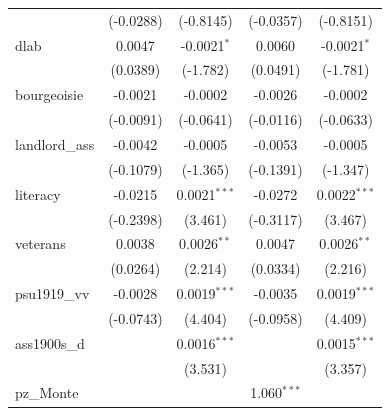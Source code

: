 \begin{table}[htbp]
\begin{tabular}{lcccc}
                                       & (-0.0288)             & (-0.8145)              & (-0.0357)            & (-0.8151)\\   
      dlab                             & 0.0047                & -0.0021$^{*}$          & 0.0060               & -0.0021$^{*}$\\   
                                       & (0.0389)              & (-1.782)               & (0.0491)             & (-1.781)\\   
      bourgeoisie                      & -0.0021               & -0.0002                & -0.0026              & -0.0002\\   
                                       & (-0.0091)             & (-0.0641)              & (-0.0116)            & (-0.0633)\\   
      landlord\_ass                    & -0.0042               & -0.0005                & -0.0053              & -0.0005\\   
                                       & (-0.1079)             & (-1.365)               & (-0.1391)            & (-1.347)\\   
      literacy                         & -0.0215               & 0.0021$^{***}$         & -0.0272              & 0.0022$^{***}$\\   
                                       & (-0.2398)             & (3.461)                & (-0.3117)            & (3.467)\\   
      veterans                         & 0.0038                & 0.0026$^{**}$          & 0.0047               & 0.0026$^{**}$\\   
                                       & (0.0264)              & (2.214)                & (0.0334)             & (2.216)\\   
      psu1919\_vv                      & -0.0028               & 0.0019$^{***}$         & -0.0035              & 0.0019$^{***}$\\   
                                       & (-0.0743)             & (4.404)                & (-0.0958)            & (4.409)\\   
      ass1900s\_d                      &                       & 0.0016$^{***}$         &                      & 0.0015$^{***}$\\   
                                       &                       & (3.531)                &                      & (3.357)\\   
      pz\_Monte                        &                       &                        & 1.060$^{***}$        &   \\   

\end{tabular}
\end{table}
